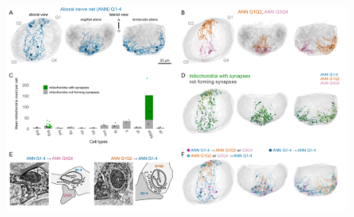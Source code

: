 \documentclass[
  11pt,
]{article}
\begin{document}
\begin{figure}[H]

{\centering \includegraphics{figures/Figure2.png}

}


\end{figure}
\end{document}
